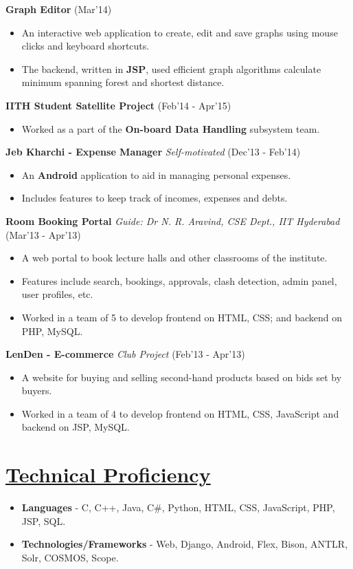 \documentclass[8pt]{extarticle}
\newcommand{\heading}[1]{
\section*{\color{red}\underline{#1}}
}
\begin{document}
\space
\textbf{Graph Editor} \hfill (Mar'14)
\begin{itemize}
\item An interactive web application to create, edit and save graphs using mouse clicks and keyboard shortcuts.
\item The backend, written in \textbf{JSP}, used efficient graph algorithms calculate minimum spanning forest and shortest distance.
\end{itemize}
\space
\textbf{IITH Student Satellite Project} \hfill (Feb'14 - Apr'15)
\begin{itemize}
\item Worked as a part of the \textbf{On-board Data Handling} subsystem team.
\end{itemize}
\space
\textbf{Jeb Kharchi - Expense Manager} \textit{Self-motivated} \hfill (Dec'13 - Feb'14)
\begin{itemize}
\item An \textbf{Android} application to aid in managing personal expenses.
\item Includes features to keep track of incomes, expenses and debts.
\end{itemize}
\space
\textbf{Room Booking Portal} \textit{Guide: Dr N. R. Aravind, CSE Dept., IIT Hyderabad} \hfill (Mar'13 - Apr'13)
\begin{itemize}
\item A web portal to book lecture halls and other classrooms of the institute.
\item Features include search, bookings, approvals, clash detection, admin panel, user profiles, etc.
\item Worked in a team of 5 to develop frontend on HTML, CSS; and backend on PHP, MySQL.
\end{itemize}
\space
\textbf{LenDen - E-commerce} \textit{Club Project} \hfill (Feb'13 - Apr'13)
\begin{itemize}
\item A website for buying and selling second-hand products based on bids set by buyers.
\item Worked in a team of 4 to develop frontend on HTML, CSS, JavaScript and backend on JSP, MySQL.
\end{itemize}

\heading{Technical Proficiency}
\begin{itemize}
\item \textbf{Languages} - C, C++, Java, C\#, Python, HTML, CSS, JavaScript, PHP, JSP, SQL.
\item \textbf{Technologies/Frameworks} - Web, Django, Android, Flex, Bison, ANTLR, Solr, COSMOS, Scope.
\end{itemize}
\end{document}
